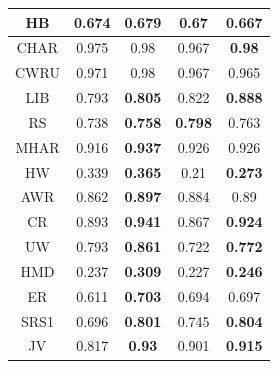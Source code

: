 \documentclass[conference]{IEEEtran}
\begin{document}
\begin{table}[tp]
\begin{center}
\begin{tabular}{|c|cc|cc|}
HB      & \multicolumn{1}{c|}{0.674}          & 0.679          & \multicolumn{1}{c|}{0.67}           & 0.667          \\ \hline
CHAR    & \multicolumn{1}{c|}{0.975}          & 0.98           & \multicolumn{1}{c|}{0.967}          & \textbf{0.98}  \\ \hline
CWRU    & \multicolumn{1}{c|}{0.971}          & 0.98           & \multicolumn{1}{c|}{0.967}          & 0.965          \\ \hline
LIB     & \multicolumn{1}{c|}{0.793}          & \textbf{0.805} & \multicolumn{1}{c|}{0.822}          & \textbf{0.888} \\ \hline
RS      & \multicolumn{1}{c|}{0.738}          & \textbf{0.758} & \multicolumn{1}{c|}{\textbf{0.798}} & 0.763          \\ \hline
MHAR    & \multicolumn{1}{c|}{0.916}          & \textbf{0.937} & \multicolumn{1}{c|}{0.926}          & 0.926          \\ \hline
HW      & \multicolumn{1}{c|}{0.339}          & \textbf{0.365} & \multicolumn{1}{c|}{0.21}           & \textbf{0.273} \\ \hline
AWR     & \multicolumn{1}{c|}{0.862}          & \textbf{0.897} & \multicolumn{1}{c|}{0.884}          & 0.89           \\ \hline
CR      & \multicolumn{1}{c|}{0.893}          & \textbf{0.941} & \multicolumn{1}{c|}{0.867}          & \textbf{0.924} \\ \hline
UW      & \multicolumn{1}{c|}{0.793}          & \textbf{0.861} & \multicolumn{1}{c|}{0.722}          & \textbf{0.772} \\ \hline
HMD     & \multicolumn{1}{c|}{0.237}          & \textbf{0.309} & \multicolumn{1}{c|}{0.227}          & \textbf{0.246} \\ \hline
ER      & \multicolumn{1}{c|}{0.611}          & \textbf{0.703} & \multicolumn{1}{c|}{0.694}          & 0.697          \\ \hline
SRS1    & \multicolumn{1}{c|}{0.696}          & \textbf{0.801} & \multicolumn{1}{c|}{0.745}          & \textbf{0.804} \\ \hline
JV      & \multicolumn{1}{c|}{0.817}          & \textbf{0.93}  & \multicolumn{1}{c|}{0.901}          & \textbf{0.915} \\ \hline
\end{tabular}
\end{center}
\end{table}
\end{document}
